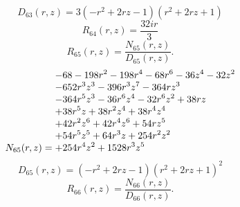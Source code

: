 \documentclass[11pt,a4paper]{article}
\begin{document}
\begin{equation}
D_{63}(r,z)=3 \left(- r^{2} + 2 r z - 1\right) \left(r^{2} + 2 r z + 1\right)
\label{eq:cat-denominator-63}
\end{equation}
\begin{equation}
R_{64}(r,z)=\frac{32 i r}{3}
\label{eq:cat-rational-64}
\end{equation}
\begin{equation}
R_{65}(r,z)=\frac{N_{65}(r,z)}{D_{65}(r,z)}.
\label{eq:cat-rational-65}
\end{equation}
\begin{equation}
N_{65}(r,z)=\shortstack[l]{$\displaystyle  - 68 - 198 r^{2} - 198 r^{4} - 68 r^{6} - 36 z^{4} - 32 z^{2}$\\
$\displaystyle  - 652 r^{3} z^{3} - 396 r^{3} z^{7} - 364 r z^{3}$\\
$\displaystyle  - 364 r^{5} z^{3} - 36 r^{6} z^{4} - 32 r^{6} z^{2} + 38 r z$\\
$\displaystyle  + 38 r^{5} z + 38 r^{2} z^{4} + 38 r^{4} z^{4}$\\
$\displaystyle  + 42 r^{2} z^{6} + 42 r^{4} z^{6} + 54 r z^{5}$\\
$\displaystyle  + 54 r^{5} z^{5} + 64 r^{3} z + 254 r^{2} z^{2}$\\
$\displaystyle  + 254 r^{4} z^{2} + 1528 r^{3} z^{5}$}
\label{eq:cat-numerator-65}
\end{equation}
\begin{equation}
D_{65}(r,z)=\left(- r^{2} + 2 r z - 1\right) \left(r^{2} + 2 r z + 1\right)^{2}
\label{eq:cat-denominator-65}
\end{equation}
\begin{equation}
R_{66}(r,z)=\frac{N_{66}(r,z)}{D_{66}(r,z)}.
\label{eq:cat-rational-66}
\end{equation}
\end{document}
